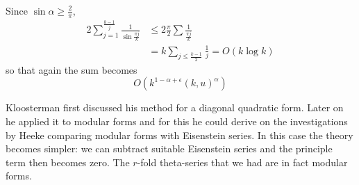 Since $\sin \alpha \geq \frac{2}{\pi}$,
\begin{align*}
  2 \sum^{\frac{k-1}{j}}_{j=1} \frac{1}{\sin \frac{\pi j}{k}} & \leq 2
  \frac{\pi}{2} \sum \frac{1}{\frac{\pi j}{k}}\\
  & = k \sum_{j \leq \frac{k-1}{2}} \frac{1}{j} = O (k \log k)
\end{align*}
so that again the sum becomes
$$
O \left(k^{1- \alpha + \epsilon} (k, u)^\alpha \right)
$$

Kloosterman first discussed his method for a diagonal quadratic
form. Later on he applied it to modular forms and for this he could
derive on the investigations by Heeke comparing modular forms with
Eisenstein series. In this case the theory becomes simpler: we can
subtract suitable Eisenstein series and the principle term then
becomes zero. The $r$-fold theta-series that we had are in fact
modular forms.

